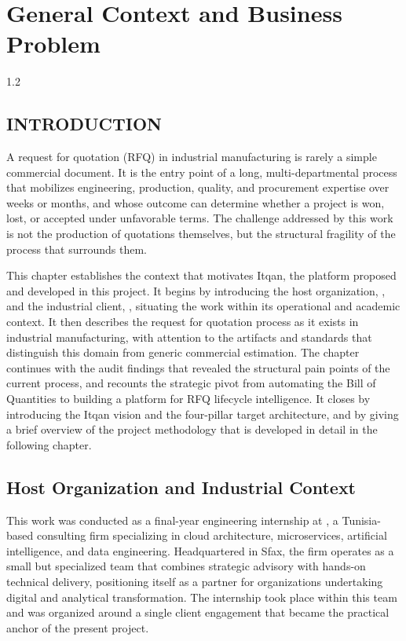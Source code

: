 \chapter{General Context and Business Problem}
\begin{spacing}{1.2}
\minitoc
\thispagestyle{MyStyle}
\end{spacing}
\newpage

\section{INTRODUCTION}
A request for quotation (RFQ) in industrial manufacturing is rarely a simple commercial document. It is the entry point of a long, multi-departmental process that mobilizes engineering, production, quality, and procurement expertise over weeks or months, and whose outcome can determine whether a project is won, lost, or accepted under unfavorable terms. The challenge addressed by this work is not the production of quotations themselves, but the structural fragility of the process that surrounds them.

This chapter establishes the context that motivates Itqan, the platform proposed and developed in this project. It begins by introducing the host organization, \hostCompany, and the industrial client, \clientCompany, situating the work within its operational and academic context. It then describes the request for quotation process as it exists in industrial manufacturing, with attention to the artifacts and standards that distinguish this domain from generic commercial estimation. The chapter continues with the audit findings that revealed the structural pain points of the current process, and recounts the strategic pivot from automating the Bill of Quantities to building a platform for RFQ lifecycle intelligence. It closes by introducing the Itqan vision and the four-pillar target architecture, and by giving a brief overview of the project methodology that is developed in detail in the following chapter.

\section{Host Organization and Industrial Context}
This work was conducted as a final-year engineering internship at \hostCompany, a Tunisia-based consulting firm specializing in cloud architecture, microservices, artificial intelligence, and data engineering. Headquartered in Sfax, the firm operates as a small but specialized team that combines strategic advisory with hands-on technical delivery, positioning itself as a partner for organizations undertaking digital and analytical transformation. The internship took place within this team and was organized around a single client engagement that became the practical anchor of the present project.

